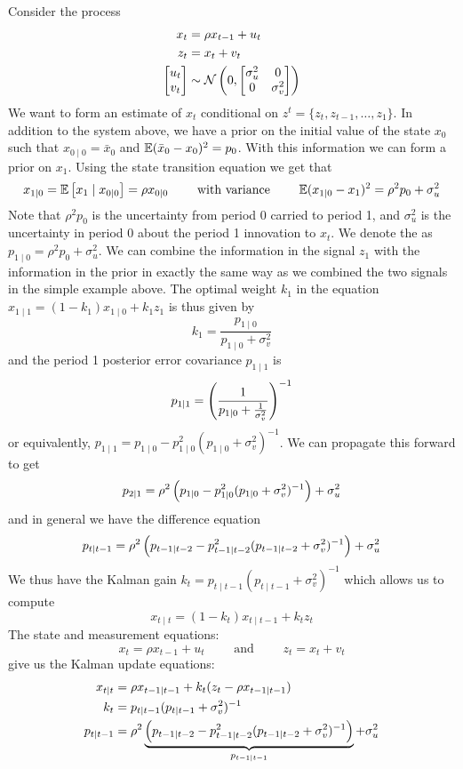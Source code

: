 \documentclass[10pt]{article}
\begin{document}
\begin{example}
	 Consider the process \begin{align*} x_t &= \rho x_{t-1} + u_t \\ z_t &= x_t + v_t \\ \begin{bmatrix}u_t \\ v_t\end{bmatrix} &\sim \mathcal{N} \left( 0,\begin{bmatrix}\sigma_u^2 & 0 \\ 0 & \sigma_v^2\end{bmatrix}\right)\end{align*}We want to form an estimate of $x_t$ conditional on $z^t = \{z_t,z_{t-1},\dots,z_1\}$. In addition to the system above, we have a prior on the initial value of the state $x_0$ such that $x_{0\mid0} = \bar{x}_0$ and $\mathbb{E}(\bar{x}_0 - x_0)^2 = p_0$. With this information we can form a prior on $x_1$. Using the state transition equation we get that\[x_{1\mid 0} = \mathbb{E}\left[ x_1 \mid x_{0\mid0}\right] =\rho x_{0\mid0} \qquad \text{ with variance } \qquad \mathbb{E}(x_{1\mid 0} - x_1)^2 = \rho^2 p_0 + \sigma^2_u\]Note that $\rho^2p_0$ is the uncertainty from period 0 carried to period 1, and $\sigma^2_u$ is the uncertainty in period 0 about the period 1 innovation to $x_t$. We denote the  as $p_{1\mid0} = \rho^2 p_0 + \sigma^2_u$. We can combine the information in the signal $z_1$ with the information in the prior in exactly the same way as we combined the two signals in the simple example above. The optimal weight $k_1$ in the equation $x_{1\mid1} = (1-k_1)x_{1\mid0} + k_1z_1$ is thus given by \[k_1 = \frac{p_{1\mid0}}{p_{1\mid0}+\sigma^2_v}\]and the period 1 posterior error covariance $p_{1\mid1}$ is\[p_{1\mid1} = \left( \frac{1}{p_{1\mid0} + \frac{1}{\sigma^2_v}}\right)^{-1}\]or equivalently, $p_{1\mid1} = p_{1\mid0} - p^2_{1\mid0}(p_{1\mid0} + \sigma_v^2)^{-1}$. We can propagate this forward to get \[p_{2\mid1} = \rho^2\left( p_{1\mid0} - p_{1\mid0}^2 (p_{1\mid0}+\sigma_v^2)^{-1}\right) + \sigma_u^2\]and in general we have the difference equation\[p_{t\mid t-1} = \rho^2 \left( p_{t-1\mid t-2} - p^2_{t-1\mid t-2}(p_{t-1\mid t-2} + \sigma_v^2)^{-1}\right) + \sigma^2_u\]We thus have the Kalman gain $k_t = p_{t\mid t-1}(p_{t \mid t-1} + \sigma_v^2)^{-1}$ which allows us to compute\[x_{t\mid t}= (1-k_t)x_{t\mid t-1} + k_tz_t\]The state and measurement equations:\[x_t = \rho x_{t-1} + u_t \qquad \text{ and } \qquad z_t = x_t + v_t\]give us the Kalman update equations:\begin{align*} x_{t\mid t} &= \rho x_{t-1\mid t-1} + k_t(z_t - \rho x_{t-1 \mid t-1}) \\ k_t &= p_{t\mid t-1}(p_{t\mid t-1} + \sigma_v^2)^{-1} \\ p_{t\mid t-1} &= \rho^2 \underbrace{\left( p_{t-1\mid t-2} - p^2_{t-1\mid t-2}(p_{t-1\mid t-2} + \sigma_v^2)^{-1}\right)}_{p_{t-1\mid t-1}} + \sigma^2_u\end{align*}
\end{example}
\end{document}
